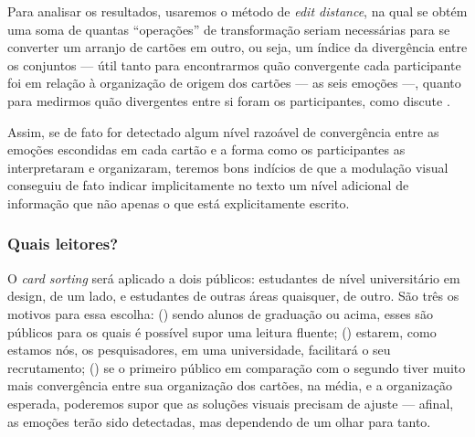 \documentclass[a4paper,11pt,titlepage,singlespacing]{article}
\newcommand{\num}[1]{(\oldstylenums{#1})}
\newcommand\todo[1]{\textcolor{red}{#1}}
\begin{document}

Para analisar os resultados, usaremos o método de \textit{edit distance}, na qual se obtém uma soma de quantas ``operações'' de transformação seriam necessárias para se converter um arranjo de cartões em outro, ou seja, um índice da divergência entre os conjuntos — útil tanto para encontrarmos quão convergente cada participante foi em relação à organização de origem dos cartões — as seis emoções —, quanto para medirmos quão divergentes entre si foram os participantes, como discute .

Assim, se de fato for detectado algum nível razoável de convergência entre as emoções escondidas em cada cartão e a forma como os participantes as interpretaram e organizaram, teremos bons indícios de que a modulação visual conseguiu de fato indicar implicitamente no texto um nível adicional de informação que não apenas o que está explicitamente escrito. 

\subsubsection*{Quais leitores?}

O \textit{card sorting} será aplicado a dois públicos: estudantes de nível universitário em design, de um lado, e estudantes de outras áreas quaisquer, de outro. São três os motivos para essa escolha: \num{1} sendo alunos de graduação ou acima, esses são públicos para os quais é possível supor uma leitura fluente; \num{2} estarem, como estamos nós, os pesquisadores, em uma universidade, facilitará o seu recrutamento; \num{3} se o primeiro público em comparação com o segundo tiver muito mais convergência entre sua organização dos cartões, na média, e a organização esperada, poderemos supor que as soluções visuais precisam de ajuste — afinal, as emoções terão sido detectadas, mas dependendo de um olhar para tanto.

\end{document}
